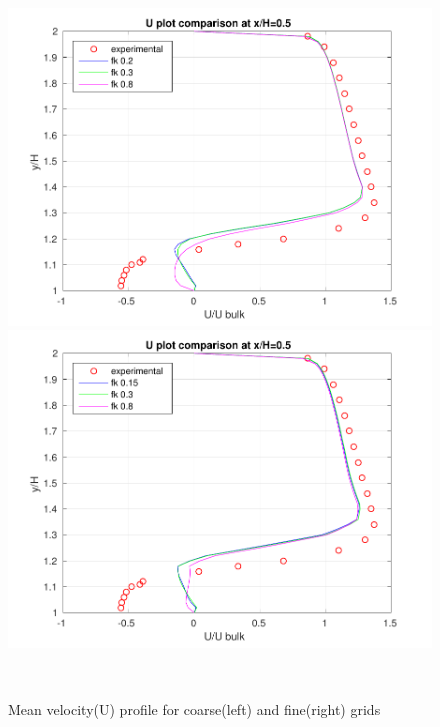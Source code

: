 \begin{figure}[H]
\begin{minipage}[b]{0.5\linewidth}
\includegraphics[scale=0.5]{figure/coarse/U_coarse_five.pdf}
\end{minipage}
\begin{minipage}[b]{0.5\linewidth}
\includegraphics[scale=0.5]{figure/fine/U_fine_five.pdf}
\end{minipage}\\
\caption{Mean velocity(U) profile for coarse(left) and fine(right) grids}
\label{fig:eight}
\end{figure}

